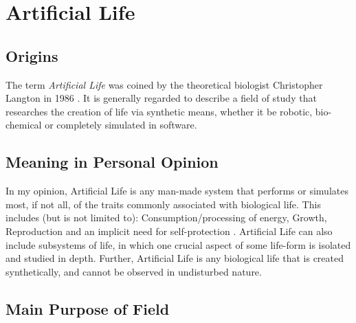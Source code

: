 \documentclass[10pt,a4paper]{article}
\begin{document}
		\pagebreak
		\section{Artificial Life}
		
			\subsection{Origins}
		
				The term \textsl{Artificial Life} was coined by the theoretical biologist Christopher Langton in 1986 \cite{artlife}. It is generally regarded to describe a field of study that researches the creation of life via synthetic means, whether it be robotic, bio-chemical or completely simulated in software.
		
			\subsection{Meaning in Personal Opinion}
		
				In my opinion, Artificial Life is any man-made system that performs or simulates most, if not all, of the traits commonly associated with biological life. This includes (but is not limited to): Consumption/processing of energy, Growth, Reproduction and an implicit need for self-protection \cite{cfl}. Artificial Life can also include subsystems of life, in which one crucial aspect of some life-form is isolated and studied in depth. Further, Artificial Life is any biological life that is created synthetically, and cannot be observed in undisturbed nature.
				
				
				
			\subsection{Main Purpose of Field}
			
\end{document}
